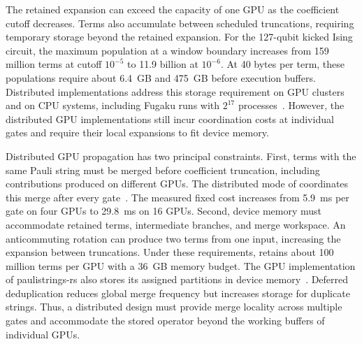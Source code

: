 The retained expansion can exceed the capacity of one GPU as the coefficient cutoff decreases.
Terms also accumulate between scheduled truncations, requiring temporary storage beyond the retained expansion.
For the 127-qubit kicked Ising circuit, the maximum population at a window boundary increases from 159 million terms at cutoff $10^{-5}$ to 11.9 billion at $10^{-6}$.
At 40 bytes per term, these populations require about 6.4~GB and 475~GB before execution buffers.
Distributed implementations address this storage requirement on GPU clusters and on CPU systems, including Fugaku runs with $2^{17}$ processes~\cite{cupauliprop,orqa}.
However, the distributed GPU implementations still incur coordination costs at individual gates and require their local expansions to fit device memory.

Distributed GPU propagation has two principal constraints.
First, terms with the same Pauli string must be merged before coefficient truncation, including contributions produced on different GPUs.
The distributed mode of \cuPP coordinates this merge after every gate~\cite{cupauliprop}.
The measured fixed cost increases from 5.9~ms per gate on four GPUs to 29.8~ms on 16 GPUs.
Second, device memory must accommodate retained terms, intermediate branches, and merge workspace.
An anticommuting rotation can produce two terms from one input, increasing the expansion between truncations.
Under these requirements, \cuPP retains about 100 million terms per GPU with a 36~GB memory budget.
The GPU implementation of paulistrings-rs also stores its assigned partitions in device memory~\cite{paulistrings}.
Deferred deduplication reduces global merge frequency but increases storage for duplicate strings.
Thus, a distributed design must provide merge locality across multiple gates and accommodate the stored operator beyond the working buffers of individual GPUs.

